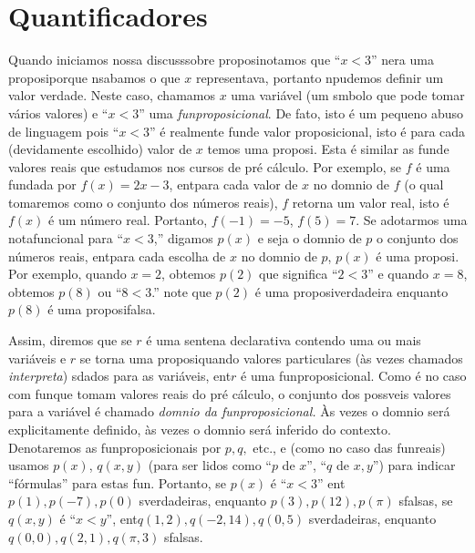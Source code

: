 \section{Quantificadores}\label{quantificadores}

Quando iniciamos nossa discuss\ao sobre proposi\coes notamos que ``$x<3$'' n\ao era uma proposi\cao porque n\ao sab\ih amos o que $x$ representava, portanto n\ao pudemos definir um valor verdade. Neste caso, chamamos $x$ uma vari\'avel (um s\ih mbolo que pode tomar v\'arios valores) e ``$x<3$'' uma {\it fun\cao proposicional}. De fato, isto \'e um pequeno abuso de linguagem pois ``$x<3$'' \'e realmente fun\cao de valor proposicional, isto \'e para cada (devidamente escolhido) valor de $x$ temos uma proposi\caoi. Esta \'e similar as fun\coes de valores reais que estudamos nos cursos de pr\'e c\'alculo. Por exemplo, se $f$ \'e uma fun\cao dada por $f(x)=2x-3$, ent\ao para cada valor de $x$ no dom\ih nio de $f$ (o qual tomaremos como o conjunto dos n\'umeros reais), $f$ retorna um valor real, isto \'e $f(x)$ \'e um n\'umero real. Portanto, $f(-1)=-5$, $f(5)=7$. Se adotarmos uma nota\cao funcional para ``$x<3$,'' digamos $p(x)$ e seja o dom\ih nio de $p$ o conjunto dos n\'umeros reais, ent\ao para cada escolha de $x$ no dom\ih nio de $p$, $p(x)$ \'e uma proposi\caoi. Por exemplo, quando $x=2$, obtemos $p(2)$ que significa ``$2<3$'' e quando $x=8$, obtemos $p(8)$ ou ``$8<3$.'' note que $p(2)$ \'e uma proposi\cao verdadeira enquanto $p(8)$ \'e uma proposi\cao falsa. 

Assim, diremos que se $r$ \'e uma senten\cc a declarativa contendo uma ou mais vari\'aveis e $r$ se torna uma proposi\cao quando valores particulares (\`as vezes chamados {\it interpreta\cois}) s\ao dados para as vari\'aveis, ent\ao $r$ \'e uma fun\cao proposicional. Como \'e no caso com fun\coes que tomam valores reais do pr\'e c\'alculo, o conjunto dos poss\ih veis valores para a vari\'avel \'e chamado {\it dom\ih nio da fun\cao proposicional.} \`As vezes o dom\ih nio ser\'a explicitamente definido, \`as vezes o dom\ih nio ser\'a inferido do contexto. Denotaremos as fun\coes proposicionais por $p,q,$ etc., e (como no caso das fun\coes reais) usamos $p(x)$, $q(x,y)$ (para ser lidos como ``$p$ de $x$'', ``$q$ de $x,y$'') para indicar ``f\'ormulas'' para estas fun\cois. Portanto, se $p(x)$ \'e ``$x<3$'' ent\ao $p(1), p(-7), p(0)$ s\ao verdadeiras, enquanto $p(3), p(12), p(\pi)$ s\ao falsas, se $q(x,y)$ \'e ``$x<y$'', ent\ao $q(1,2), q(-2,14), q(0,5)$ s\ao verdadeiras, enquanto $q(0,0), q(2,1), q(\pi,3)$ s\ao falsas. 

